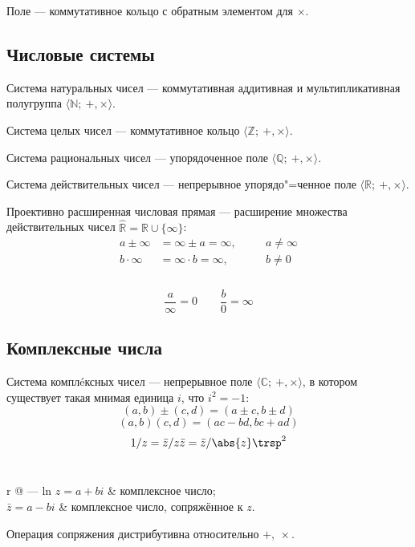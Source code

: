 {\ital Поле} --- коммутативное кольцо с обратным элементом для $\times$.

\subsection{Числовые системы}

{\ital Система натуральных чисел} --- коммутативная аддитивная и мультипликативная полугруппа $\langle\mathbb{N};\ +,\times\rangle$.\par

{\ital Система целых чисел} --- коммутативное кольцо $\langle\mathbb{Z};\ +,\times\rangle$.
\par

{\ital Система рациональных чисел} --- упорядоченное поле $\langle\mathbb{Q};\ +,\times
\rangle$.\par

{\ital Система действительных чисел} --- непрерывное упорядо"=ченное поле $\langle\mathbb
{R};\ +,\times\rangle$.

{\ital Проективно расширенная числовая прямая} --- расширение множества действительных 
чисел $\widehat{\mathbb{R}}=\mathbb{R}\cup\{\infty\}$:
\begin{alignat*}{2}
a\pm\infty&=\infty\pm a=\infty,\quad &&a\neq\infty\\
b\cdot\infty&=\infty\cdot b=\infty, &&b\neq 0\\
\end{alignat*}\\[-26pt]
$$\frac{a}{\infty}=0\quad\quad\frac{b}{0}=\infty$$

\newpage
\subsection{Комплексные числа}

{\ital Система комплéксных чисел} --- непрерывное поле $\langle\mathbb{C};\ +,
\times\rangle$, в котором существует такая {\ital мнимая единица} $i$, что $i^2=-1$:
$$(a,b)\pm(c,d)=(a\pm c,b\pm d)$$
$$(a,b)(c,d)=(ac-bd,bc+ad)$$
$$1/z=\bar z/z\bar z=\bar z/\abs{z}\trsp^2$$\\
\begin{tabularc}{0pt}{0pt}{r @{ --- } l}{n}
$z=a+bi$ & комплексное число;\\
$\bar z=a-bi$ & комплексное число, {\ital сопряжённое} к $z$.
\end{tabularc}

Операция сопряжения {\ital дистрибутивна} относительно $+,\ \times$.

